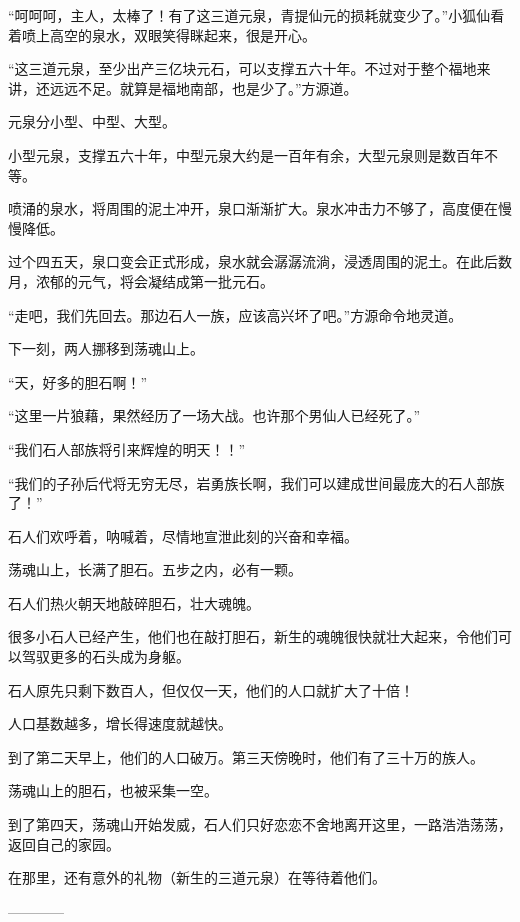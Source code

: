 \begin{this_body}
“呵呵呵，主人，太棒了！有了这三道元泉，青提仙元的损耗就变少了。”小狐仙看着喷上高空的泉水，双眼笑得眯起来，很是开心。

“这三道元泉，至少出产三亿块元石，可以支撑五六十年。不过对于整个福地来讲，还远远不足。就算是福地南部，也是少了。”方源道。

元泉分小型、中型、大型。

小型元泉，支撑五六十年，中型元泉大约是一百年有余，大型元泉则是数百年不等。

喷涌的泉水，将周围的泥土冲开，泉口渐渐扩大。泉水冲击力不够了，高度便在慢慢降低。

过个四五天，泉口变会正式形成，泉水就会潺潺流淌，浸透周围的泥土。在此后数月，浓郁的元气，将会凝结成第一批元石。

“走吧，我们先回去。那边石人一族，应该高兴坏了吧。”方源命令地灵道。

下一刻，两人挪移到荡魂山上。

“天，好多的胆石啊！”

“这里一片狼藉，果然经历了一场大战。也许那个男仙人已经死了。”

“我们石人部族将引来辉煌的明天！！”

“我们的子孙后代将无穷无尽，岩勇族长啊，我们可以建成世间最庞大的石人部族了！”

石人们欢呼着，呐喊着，尽情地宣泄此刻的兴奋和幸福。

荡魂山上，长满了胆石。五步之内，必有一颗。

石人们热火朝天地敲碎胆石，壮大魂魄。

很多小石人已经产生，他们也在敲打胆石，新生的魂魄很快就壮大起来，令他们可以驾驭更多的石头成为身躯。

石人原先只剩下数百人，但仅仅一天，他们的人口就扩大了十倍！

人口基数越多，增长得速度就越快。

到了第二天早上，他们的人口破万。第三天傍晚时，他们有了三十万的族人。

荡魂山上的胆石，也被采集一空。

到了第四天，荡魂山开始发威，石人们只好恋恋不舍地离开这里，一路浩浩荡荡，返回自己的家园。

在那里，还有意外的礼物（新生的三道元泉）在等待着他们。

------------

\end{this_body}

